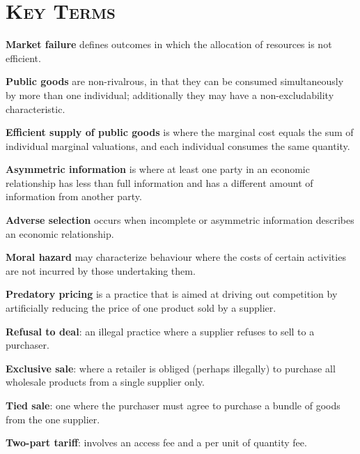 \newpage
{}
	\section*{\textsc{Key Terms}}
\begin{keyterms}
\textbf{Market failure} defines outcomes in which the allocation of resources is not efficient.

\textbf{Public goods} are non-rivalrous, in that they can be consumed simultaneously by more than one individual; additionally they may have a non-excludability characteristic.

\textbf{Efficient supply of public goods} is where the marginal cost equals the sum of individual marginal valuations, and each individual consumes the same quantity.

\textbf{Asymmetric information} is where at least one party in an economic relationship has less than full information and has a different amount of information from another party.

\textbf{Adverse selection} occurs when incomplete or asymmetric information describes an economic relationship.

\textbf{Moral hazard} may characterize behaviour where the costs of certain activities are not incurred by those undertaking them.

\textbf{Predatory pricing} is a practice that is aimed at driving out competition by artificially reducing the price of one product sold by a supplier.

\textbf{Refusal to deal}: an illegal practice where a supplier refuses to sell to a purchaser.

\textbf{Exclusive sale}: where a retailer is obliged (perhaps illegally) to purchase all wholesale products from a single supplier only.

\textbf{Tied sale}: one where the purchaser must agree to purchase a bundle of goods from the one supplier.

\textbf{Two-part tariff}: involves an access fee and a per unit of quantity fee.
\end{keyterms}